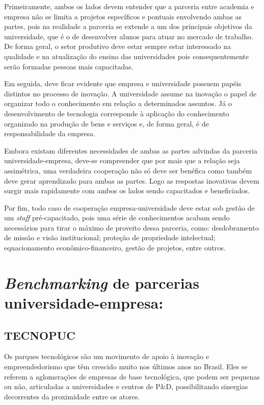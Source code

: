 Primeiramente, ambos os lados devem entender que a parceria entre academia e empresa não se limita a projetos específicos e pontuais envolvendo ambas as partes, pois na realidade a parceria se extende a um dos principais objetivos da universidade, que é o de desenvolver alunos para atuar no mercado de trabalho. De forma geral, o setor produtivo deve estar sempre estar interessado na qualidade e na atualização do ensino das universidades pois consequentemente serão formadas pessoas mais capacitadas.

Em seguida, deve ficar evidente que empresa e universidade possuem papéis distintos no processo de inovação. A universidade assume na inovação o papel de organizar todo o conhecimento em relação a determinados assuntos. Já o desenvolvimento de tecnologia corresponde à aplicação do conhecimento organizado na produção de bens e serviços e, de forma geral, é de responsabilidade da empresa.

Embora existam diferentes necessidades de ambas as partes advindas da parceria universidade-empresa, deve-se compreender que por mais que a relação seja assimétrica, uma verdadeira cooperação não só deve ser benéfica como também deve gerar aprendizado para ambas as partes. Logo as respostas inovativas devem surgir mais rapidamente com ambos os lados sendo capacitados e beneficiados.

Por fim, todo caso de cooperação empresa-universidade deve estar sob gestão de um \textit{staff} pré-capacitado, pois uma série de conhecimentos acabam sendo necessários para tirar o máximo de proveito dessa parceria, como: desdobramento de missão e visão institucional; proteção de propriedade intelectual; equacionamento econômico-financeiro, gestão de projetos, entre outros.

\section{\textit{Benchmarking} de parcerias universidade-empresa:} %
\label{sec:cases}

\subsection{TECNOPUC}

Os parques tecnológicos são um movimento de apoio à inovação e empreendedorismo que têm crescido muito nos últimos anos no Brasil. Eles se referem a aglomerações de empresas de base tecnológica, que podem ser pequenas ou não, articuladas a universidades e centros de P\&D, possibilitando sinergias decorrentes da proximidade entre os atores. \cite{parquestecnologicos} 

